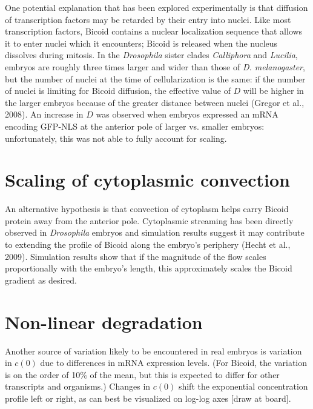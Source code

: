 \documentclass{article}
\begin{document}
One potential explanation that has been explored experimentally is that diffusion of transcription factors may be retarded by their entry into nuclei. Like most transcription factors, Bicoid contains a nuclear localization sequence that allows it to enter nuclei which it encounters; Bicoid is released when the nucleus dissolves during mitosis. In the \textit{Drosophila} sister clades \textit{Calliphora} and \textit{Lucilia}, embryos are roughly three times larger and wider than those of \textit{D. melanogaster}, but the number of nuclei at the time of cellularization is the same:  if the number of nuclei is limiting for Bicoid diffusion, the effective value of $D$ will be higher in the larger embryos because of the greater distance between nuclei (Gregor et al., 2008). An increase in $D$ was observed when embryos expressed an mRNA encoding GFP-NLS at the anterior pole of larger vs. smaller embryos: unfortunately, this was not able to fully account for scaling.

\section*{Scaling of cytoplasmic convection}

An alternative hypothesis is that convection of cytoplasm helps carry Bicoid protein away from the anterior pole. Cytoplasmic streaming has been directly observed in \textit{Drosophila} embryos and simulation results suggest it may contribute to extending the profile of Bicoid along the embryo's periphery (Hecht et al., 2009). Simulation results show that if the magnitude of the flow scales proportionally with the embryo's length, this approximately scales the Bicoid gradient as desired.


\section*{Non-linear degradation}

Another source of variation likely to be encountered in real embryos is variation in $c(0)$ due to differences in mRNA expression levels. (For Bicoid, the variation is on the order of 10\% of the mean, but this is expected to differ for other transcripts and organisms.) Changes in $c(0)$ shift the exponential concentration profile left or right, as can best be visualized on log-log axes [draw at board].\\
\end{document}
